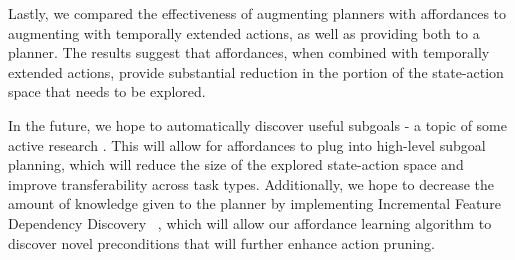 \documentclass[conference]{IEEEtran}
\begin{document}
Lastly, we compared the effectiveness of augmenting planners with affordances to augmenting with temporally extended actions, as well as providing both to a planner. The results suggest that affordances, when combined with temporally extended actions, provide substantial reduction in the portion of the state-action space that needs to be explored.

In the future, we hope to automatically discover useful subgoals - a topic of some active research \cite{Mcgovern01automaticdiscovery,Simsek:2005:IUS:1102351.1102454}. This will allow for affordances to plug into high-level subgoal planning, which will reduce the size of the explored state-action space and improve transferability across task types. Additionally, we hope to decrease the amount of knowledge given to the planner by implementing Incremental Feature Dependency Discovery ~\cite{ICML2011Geramifard_473}, which will allow our affordance learning algorithm to discover novel preconditions that will further enhance action pruning.

{\small


}
\end{document}
